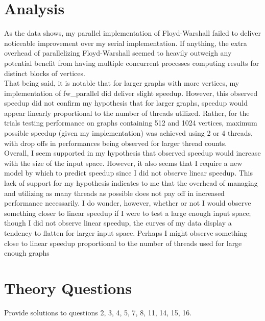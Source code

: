 \documentclass[]{article}
\begin{document}
\section{Analysis}
	As the data shows, my parallel implementation of Floyd-Warshall failed to deliver noticeable improvement over my serial implementation. If anything, the extra overhead of parallelizing Floyd-Warshall seemed to heavily outweigh any potential benefit from having multiple concurrent processes computing results for distinct blocks of vertices.
	\\
	That being said, it is notable that for larger graphs with more vertices, my implementation of fw\_parallel did deliver slight speedup. However, this observed speedup did not confirm my hypothesis that for larger graphs, speedup would appear linearly proportional to the number of threads utilized. Rather, for the trials testing performance on graphs containing 512 and 1024 vertices, maximum possible speedup (given my implementation) was achieved using 2 or 4 threads, with drop offs in performances being observed for larger thread counts.
	\\
	Overall, I seem supported in my hypothesis that observed speedup would increase with the size of the input space. However, it also seems that I require a new model by which to predict speedup since I did not observe linear speedup. This lack of support for my hypothesis indicates to me that the overhead of managing and utilizing as many threads as possible does not pay off in increased performance necessarily. I do wonder, however, whether or not I would observe something closer to linear speedup if I were to test a large enough input space; though I did not observe linear speedup, the curves of my data display a tendency to flatten for larger input space. Perhaps I might observe something close to linear speedup proportional to the number of threads used for large enough graphs
	\\

\section{Theory Questions}
Provide solutions to questions 2, 3, 4, 5, 7, 8, 11, 14, 15, 16.
\end{document}
